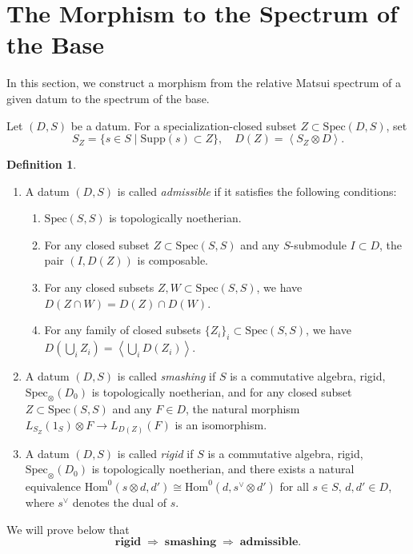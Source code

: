 \documentclass[11pt]{amsart}
\theoremstyle{definition}
\newtheorem{defn}{Definition}[section]
\theoremstyle{plain}
\theoremstyle{remark}
\newcommand{\Spec}{\mathrm{Spec}}
\newcommand{\Supp}{\mathrm{Supp}}
\newcommand{\Hom}{\mathrm{Hom}}
\newcommand{\ang}[1]{{\left\langle{#1}\right\rangle}}
\newcommand{\oSpec}{\mathrm{Spec}_{\otimes}}
\numberwithin{equation}{section}
\begin{document}
\section{The Morphism to the Spectrum of the Base}\label{section:morphism_to_base}
In this section, we construct a morphism from the relative Matsui spectrum of a given datum to the spectrum of the base.

Let \((D,S)\) be a datum.
For a specialization-closed subset \(Z\subset \Spec(D,S)\), set
\[
S_Z=\{s\in S \mid \Supp(s)\subset Z\}, 
\quad D(Z)=\ang{S_Z\otimes D}.
\]

\begin{defn}
  \begin{enumerate}
    \item A datum \((D,S)\) is called \emph{admissible} if it satisfies the following conditions:
    \begin{enumerate}
      \item \(\Spec(S,S)\) is topologically noetherian.
      \item For any closed subset \(Z\subset \Spec(S,S)\) and any \(S\)-submodule \(I\subset D\), the pair \((I,D(Z))\) is composable.
      \item For any closed subsets \(Z,W\subset \Spec(S,S)\), we have \(D(Z\cap W)=D(Z)\cap D(W)\).
      \item For any family of closed subsets \(\{Z_i\}_i\subset \Spec(S,S)\), we have \(D(\bigcup_i Z_i)=\ang{\bigcup_i D(Z_i)}\).
    \end{enumerate}

    \item A datum \((D,S)\) is called \emph{smashing} if \(S\) is a commutative algebra, rigid, \(\oSpec(D_0)\) is topologically noetherian, and for any closed subset \(Z\subset \Spec(S,S)\) and any \(F\in D\), the natural morphism \(L_{S_Z}(1_S)\otimes F\to L_{D(Z)}(F)\) is an isomorphism.

    \item A datum \((D,S)\) is called \emph{rigid} if \(S\) is a commutative algebra, rigid, \(\oSpec(D_0)\) is topologically noetherian, and there exists a natural equivalence \(\Hom^0(s\otimes d, d')\cong \Hom^0(d,s^\vee \otimes d' )\) for all \(s\in S,\, d,d'\in D\), where \(s^\vee\) denotes the dual of \(s\).
  \end{enumerate}
\end{defn}

We will prove below that
\[
\textbf{rigid} \;\Rightarrow\; \textbf{smashing} \;\Rightarrow\; \textbf{admissible}.
\]
\end{document}
